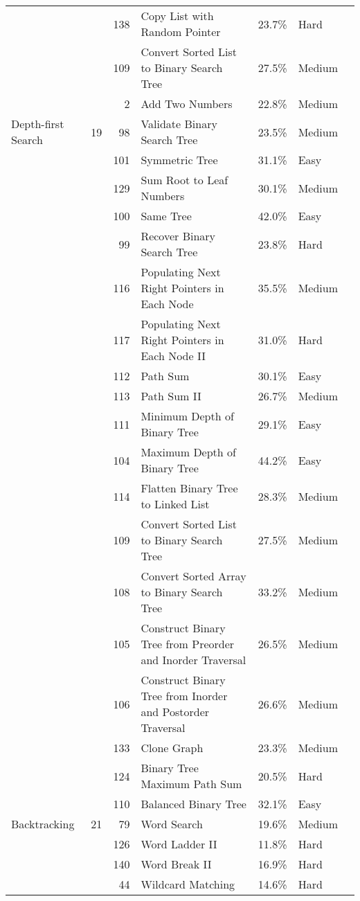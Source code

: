 \documentclass[9pt,b5paper]{article}
\begin{document}
\begin{center}
\begin{tabular}{lrrllll}
 &  & 138 & Copy List with Random Pointer & 23.7\% & Hard & \\
 &  & 109 & Convert Sorted List to Binary Search Tree & 27.5\% & Medium & \\
 &  & 2 & Add Two Numbers & 22.8\% & Medium & \\
\hline
Depth-first Search & 19 & 98 & Validate Binary Search Tree & 23.5\% & Medium & \\
 &  & 101 & Symmetric Tree & 31.1\% & Easy & \\
 &  & 129 & Sum Root to Leaf Numbers & 30.1\% & Medium & \\
 &  & 100 & Same Tree & 42.0\% & Easy & \\
 &  & 99 & Recover Binary Search Tree & 23.8\% & Hard & \\
 &  & 116 & Populating Next Right Pointers in Each Node & 35.5\% & Medium & \\
 &  & 117 & Populating Next Right Pointers in Each Node II & 31.0\% & Hard & \\
 &  & 112 & Path Sum & 30.1\% & Easy & \\
 &  & 113 & Path Sum II & 26.7\% & Medium & \\
 &  & 111 & Minimum Depth of Binary Tree & 29.1\% & Easy & \\
 &  & 104 & Maximum Depth of Binary Tree & 44.2\% & Easy & \\
 &  & 114 & Flatten Binary Tree to Linked List & 28.3\% & Medium & \\
 &  & 109 & Convert Sorted List to Binary Search Tree & 27.5\% & Medium & \\
 &  & 108 & Convert Sorted Array to Binary Search Tree & 33.2\% & Medium & \\
 &  & 105 & Construct Binary Tree from Preorder and Inorder Traversal & 26.5\% & Medium & \\
 &  & 106 & Construct Binary Tree from Inorder and Postorder Traversal & 26.6\% & Medium & \\
 &  & 133 & Clone Graph & 23.3\% & Medium & \\
 &  & 124 & Binary Tree Maximum Path Sum & 20.5\% & Hard & \\
 &  & 110 & Balanced Binary Tree & 32.1\% & Easy & \\
\hline
Backtracking & 21 & 79 & Word Search & 19.6\% & Medium & \\
 &  & 126 & Word Ladder II & 11.8\% & Hard & \\
 &  & 140 & Word Break II & 16.9\% & Hard & \\
 &  & 44 & Wildcard Matching & 14.6\% & Hard & \\

\end{tabular}
\end{center}
\end{document}
